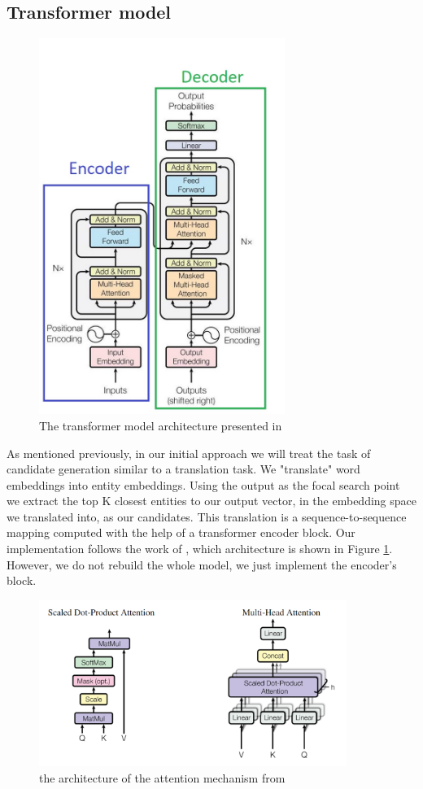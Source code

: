 \subsection{Transformer model}
\label{transformer}

\begin{figure}[h]
\centering
\includegraphics[width=8cm]{figures/transformer-architecture.jpg}
\caption{The transformer model architecture presented in \cite{Attention}}
\label{transformer}
\end{figure}

As mentioned previously, in our initial approach we will treat the task of candidate generation similar to a translation task. We "translate" word embeddings into entity embeddings. Using the output as the focal search point we extract the top K closest entities to our output vector, in the embedding space we translated into, as our candidates.\newline
This translation is a sequence-to-sequence mapping computed with the help of a transformer encoder block. Our implementation follows the work of \cite{Attention}, which architecture is shown in Figure \ref{transformer}. However, we do not rebuild the whole model, we just implement the encoder's block.\newline

\begin{figure}[h]
\centering
\includegraphics[width=10cm]{figures/multi-head-attention.png}
\caption{the architecture of the attention mechanism from \cite{Attention}}
\label{attention}
\centering
\end{figure}

